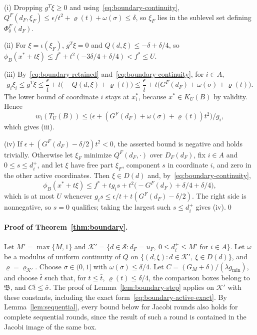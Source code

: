 (i) Dropping $g^T\xi\ge0$ and using~\eqref{eq:boundary-continuity},
$Q^F(d_F,\xi_F)\le\epsilon/t^2+\varrho(t)+\omega(\sigma)\le\delta$, so $\xi_F$
lies in the sublevel set defining $\Phi^F_\delta(d_F)$.

(ii) For $\xi=\iota(\xi_F)$, $g^T\xi=0$ and $Q(d,\xi)\le-\delta+\delta/4$, so
$\phi_B(x^*+t\xi)\le f^*+t^2(-3\delta/4+\delta/4)<f^*\le U$.

(iii) By~\eqref{eq:boundary-retained} and~\eqref{eq:boundary-continuity},
for $i\in A$,
\[
  g_i\xi_i\le g^T\xi\le\frac{\epsilon}{t}+t\bigl(-Q(d,\xi)+\varrho(t)\bigr)
  \le\frac{\epsilon}{t}+t\bigl(G^F(d_F)+\omega(\sigma)+\varrho(t)\bigr).
\]
The lower bound of coordinate $i$ stays at $x_i^*$, because $x^*\in K_U(B)$
by validity. Hence
\begin{equation}\label{eq:boundary-active-exact}
  w_i(T_U(B))\le\bigl(\epsilon+(G^F(d_F)+\omega(\sigma)+\varrho(t))t^2\bigr)/g_i,
\end{equation}
which gives (iii).

(iv) If $\epsilon+(G^F(d_F)-\delta/2)t^2<0$, the asserted bound is negative and
holds trivially. Otherwise let $\xi_F$ minimize $Q^F(d_F,\cdot)$ over
$D_F(d_F)$, fix $i\in A$ and $0\le s\le d_i^+$, and let $\xi$ have free part
$\xi_F$, component $s$ in coordinate $i$, and zero in the other active
coordinates. Then
$\xi\in D(d)$ and, by~\eqref{eq:boundary-continuity},
\[
  \phi_B(x^*+t\xi)\le f^*+tg_is+t^2\bigl(-G^F(d_F)+\delta/4+\delta/4\bigr),
\]
which is at most $U$ whenever $g_is\le\epsilon/t+t(G^F(d_F)-\delta/2)$. The
right side is nonnegative, so $s=0$ qualifies; taking the largest such
$s\le d_i^+$ gives (iv).\qed

\paragraph{Proof of Theorem~\ref{thm:boundary}.}
Let $M'=\max\{M,1\}$ and
$\mathcal K'=\{d\in\mathcal S:d_F=u_F,\ 0\le d_i^+\le M'\text{ for }i\in A\}$.
Let $\omega$ be a modulus of uniform continuity of $Q$ on
$\{(d,\xi):d\in\mathcal K',\ \xi\in D(d)\}$, and $\varrho=\varrho_{\mathcal K'}$.
Choose $\bar\sigma\in(0,1]$ with $\omega(\bar\sigma)\le\delta/4$. Let
$C=(G_M+\delta)/(\lambda g_{\min})$, and choose $\bar t$ such that, for
$t\le\bar t$, $\varrho(t)\le\delta/4$, the comparison boxes belong to
$\mathfrak B$, and $C\bar t\le\bar\sigma$. The proof of
Lemma~\ref{lem:boundary-step} applies on $\mathcal K'$ with these constants,
including the exact form~\eqref{eq:boundary-active-exact}. By
Lemma~\ref{lem:sequential}, every bound below for Jacobi rounds also holds
for complete sequential rounds, since the result of such a round is
contained in the Jacobi image of the same box.

